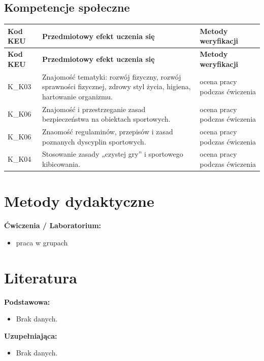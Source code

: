 \documentclass[12pt, a4paper]{article}
\newcommand{\thdrule}{\noalign{\global\setlength{\extrarowheight}{0pt}}}
\newcommand{\thdend}{\noalign{\global\setlength{\extrarowheight}{3pt}}}
\begin{document}
\subsection*{Kompetencje społeczne}
{\scriptsize
\begin{longtable}{m{1.6cm}m{9.0cm}m{4.2cm}}
\thdrule\toprule
\rowcolor{pjatkRed} {\color{white}\footnotesize\textbf{\vphantom{Ag}Kod KEU}} & {\color{white}\footnotesize\textbf{\vphantom{Ag}Przedmiotowy efekt uczenia się}} & {\color{white}\footnotesize\textbf{\vphantom{Ag}Metody weryfikacji}} \\
\midrule\thdend
\endfirsthead
\thdrule\toprule
\rowcolor{pjatkRed} {\color{white}\footnotesize\textbf{\vphantom{Ag}Kod KEU}} & {\color{white}\footnotesize\textbf{\vphantom{Ag}Przedmiotowy efekt uczenia się}} & {\color{white}\footnotesize\textbf{\vphantom{Ag}Metody weryfikacji}} \\
\midrule\thdend
\endhead
  \rowcolor{tableRowLight} K\_K03 & Znajomość tematyki: rozwój fizyczny, rozwój sprawności fizycznej, zdrowy styl życia, higiena, hartowanie organizmu. & ocena pracy podczas ćwiczenia \\
  \rowcolor{tableRowAlt} K\_K06 & Znajomość i przestrzeganie zasad bezpieczeństwa na obiektach sportowych. & ocena pracy podczas ćwiczenia \\
  \rowcolor{tableRowLight} K\_K06 & Znaomość regulaminów, przepisów i zasad poznanych dyscyplin sportowych. & ocena pracy podczas ćwiczenia \\
  \rowcolor{tableRowAlt} K\_K04 & Stosowanie zasady „czystej gry” i sportowego kibicowania. & ocena pracy podczas ćwiczenia \\
\bottomrule
\end{longtable}}

\section{Metody dydaktyczne}

\textbf{Ćwiczenia / Laboratorium:}
\begin{itemize}
  \item praca w grupach
\end{itemize}
\vspace{4pt}


\section{Literatura}

\textbf{Podstawowa:}
\begin{itemize}
  \item Brak danych.
\end{itemize}

\textbf{Uzupełniająca:}
\begin{itemize}
  \item Brak danych.
\end{itemize}
\end{document}
